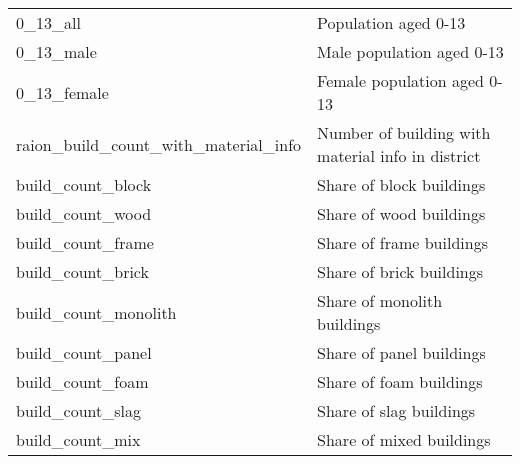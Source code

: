 \begin{longtable}[c]{ll}
    0\_13\_all                                 & Population aged 0-13                                                                                                      \\
    0\_13\_male                                & Male population aged 0-13                                                                                                 \\
    0\_13\_female                              & Female population aged 0-13                                                                                               \\
    raion\_build\_count\_with\_material\_info  & Number of building with material info in district                                                                         \\
    build\_count\_block                        & Share of block buildings                                                                                                  \\
    build\_count\_wood                         & Share of wood buildings                                                                                                   \\
    build\_count\_frame                        & Share of frame buildings                                                                                                  \\
    build\_count\_brick                        & Share of brick buildings                                                                                                  \\
    build\_count\_monolith                     & Share of monolith buildings                                                                                               \\
    build\_count\_panel                        & Share of panel buildings                                                                                                  \\
    build\_count\_foam                         & Share of foam buildings                                                                                                   \\
    build\_count\_slag                         & Share of slag buildings                                                                                                   \\
    build\_count\_mix                          & Share of mixed buildings                                                                                                  \\

\end{longtable}
